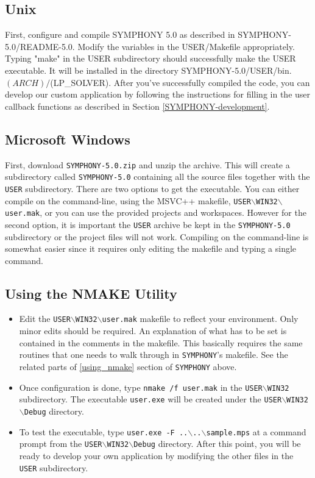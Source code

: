 \subsection{Unix}

First, configure and compile SYMPHONY 5.0 as described in
SYMPHONY-5.0/README-5.0. Modify the variables in the USER/Makefile
appropriately. Typing "make" in the USER subdirectory should successfully make
the USER executable. It will be installed in the directory
SYMPHONY-5.0/USER/bin.$(ARCH)/$(LP\_SOLVER).  After you've successfully
compiled the code, you can develop our custom application by following the
instructions for filling in the user callback functions as described in
Section \ref{SYMPHONY-development}.

\subsection{Microsoft Windows}

First, download \texttt{SYMPHONY-5.0.zip} and unzip the archive. This will
create a subdirectory called \texttt{SYMPHONY-5.0} containing all the source
files together with the \texttt{USER} subdirectory. There are two options to
get the executable. You can either compile on the command-line, using the
MSVC++ makefile,
\texttt{USER$\backslash$WIN32$\backslash$user.mak}, or you can use the 
provided projects and workspaces. However for the second option, it is 
important the \texttt{USER} archive be kept in the \texttt{SYMPHONY-5.0}
subdirectory or the project files will not work. Compiling on the 
command-line is somewhat easier since it requires only editing the makefile 
and typing a single command.

\subsection{Using the NMAKE Utility}

\begin{itemize}
\item 
Edit the \texttt{USER$\backslash$WIN32$\backslash$user.mak} makefile to reflect 
your environment. Only minor edits should be required. An explanation of 
what has to be set is contained in the comments in the makefile. This basically 
requires the same routines that one needs to walk through in 
\texttt{SYMPHONY}'s makefile. See the related parts of \ref{using_nmake} section 
of \texttt{SYMPHONY} above.

\item
Once configuration is done, type \texttt{nmake /f user.mak} in the 
\texttt{USER$\backslash$WIN32} subdirectory. The executable \texttt{user.exe} 
will be created under the \texttt{USER$\backslash$WIN32$\backslash$Debug} 
directory.

\item
To test the executable, type 
\texttt{user.exe -F ..$\backslash$..$\backslash$sample.mps} 
at a command prompt from the \texttt{USER$\backslash$WIN32$\backslash$Debug} 
directory. After this point, you will be ready to develop your own application 
by modifying the other files in the \texttt{USER} subdirectory.
\end{itemize}

